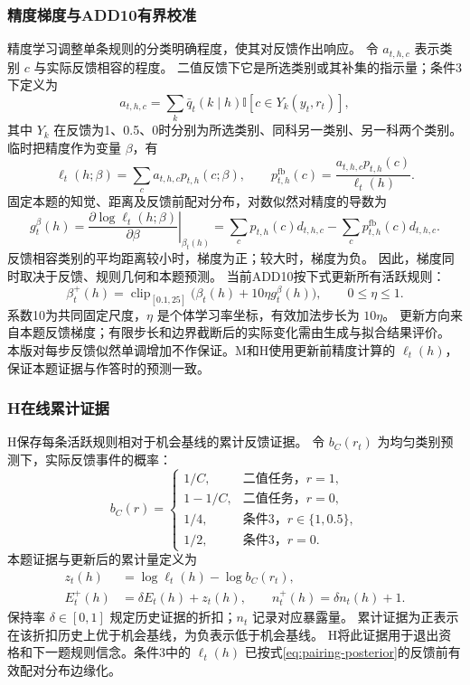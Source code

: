 \documentclass[11pt,a4paper]{article}
\numberwithin{equation}{section}
\newcommand{\ind}{\mathbb{I}}
\newcommand{\clip}{\operatorname{clip}}
\begin{document}
\subsubsection{精度梯度与ADD10有界校准}
\label{sec:precision}
精度学习调整单条规则的分类明确程度，使其对反馈作出响应。
令 $a_{t,h,c}$ 表示类别 $c$ 与实际反馈相容的程度。
二值反馈下它是所选类别或其补集的指示量；条件3下定义为
\begin{equation}
a_{t,h,c}=\sum_k\bar q_t(k\mid h)\ind[c\in Y_k(y_t,r_t)],
\end{equation}
其中 $Y_k$ 在反馈为1、0.5、0时分别为所选类别、同科另一类别、另一科两个类别。
临时把精度作为变量 $\beta$，有
\begin{equation}
\ell_t(h;\beta)=\sum_c a_{t,h,c}p_{t,h}(c;\beta),\qquad
p_{t,h}^{\mathrm{fb}}(c)=\frac{a_{t,h,c}p_{t,h}(c)}{\ell_t(h)}.
\end{equation}
固定本题的知觉、距离及反馈前配对分布，对数似然对精度的导数为
\begin{equation}
g_t^\beta(h)=\left.\frac{\partial\log\ell_t(h;\beta)}{\partial\beta}\right|_{\beta_t(h)}
=\sum_c p_{t,h}(c)d_{t,h,c}
-\sum_c p_{t,h}^{\mathrm{fb}}(c)d_{t,h,c}.
\label{eq:precision-gradient}
\end{equation}
反馈相容类别的平均距离较小时，梯度为正；较大时，梯度为负。
因此，梯度同时取决于反馈、规则几何和本题预测。
当前ADD10按下式更新所有活跃规则：
\begin{equation}
\beta_t^+(h)=\clip_{[0.1,25]}\bigl(\beta_t(h)+10\eta g_t^\beta(h)\bigr),
\qquad 0\leq\eta\leq1.
\label{eq:add10}
\end{equation}
系数10为共同固定尺度，$\eta$ 是个体学习率坐标，有效加法步长为 $10\eta$。
更新方向来自本题反馈梯度；有限步长和边界截断后的实际变化需由生成与拟合结果评价。
本版对每步反馈似然单调增加不作保证。M和H使用更新前精度计算的 $\ell_t(h)$，
保证本题证据与作答时的预测一致。

\subsubsection{H在线累计证据}
\label{sec:evidence}
H保存每条活跃规则相对于机会基线的累计反馈证据。
令 $b_C(r_t)$ 为均匀类别预测下，实际反馈事件的概率：
\begin{equation}
b_C(r)=
\begin{cases}
1/C,&\text{二值任务，}r=1,\\
1-1/C,&\text{二值任务，}r=0,\\
1/4,&\text{条件3，}r\in\{1,0.5\},\\
1/2,&\text{条件3，}r=0.
\end{cases}
\end{equation}
本题证据与更新后的累计量定义为
\begin{align}
z_t(h)&=\log\ell_t(h)-\log b_C(r_t),\\
E_t^+(h)&=\delta E_t(h)+z_t(h),\qquad
n_t^+(h)=\delta n_t(h)+1.
\label{eq:online-evidence}
\end{align}
保持率 $\delta\in[0,1]$ 规定历史证据的折扣；$n_t$ 记录对应暴露量。
累计证据为正表示在该折扣历史上优于机会基线，为负表示低于机会基线。
H将此证据用于退出资格和下一题规则信念。条件3中的 $\ell_t(h)$ 已按式\eqref{eq:pairing-posterior}的反馈前有效配对分布边缘化。
\end{document}
